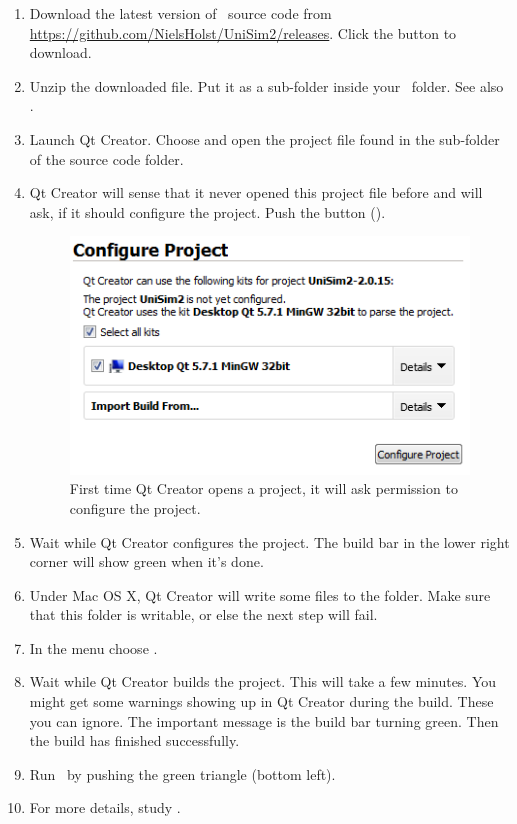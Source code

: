 \begin{enumerate}
\item Download the latest version of \US\ source code from \url{https://github.com/NielsHolst/UniSim2/releases}. Click the  button to download.
\item Unzip the downloaded file. Put it as a sub-folder inside your \devhomefolderexplained\ folder. See also .
\item Launch Qt Creator. Choose  and open the  project file found in the  sub-folder of the source code folder.
\item Qt Creator will sense that it never opened this project file before and will ask, if it should configure the project. Push the  button ().

\begin{figure} [h]
\centering
\includegraphics[width=\textwidth]{graphics/build-us-1}
\caption{First time Qt Creator opens a project, it will ask permission to configure the project.}
\label{fig:build-us-1}
\end{figure}

\item Wait while Qt Creator configures the project. The build bar in the lower right corner will show green when it's done.
\item Under Mac OS X, Qt Creator will write some files to the  folder. Make sure that this folder is writable, or else the next step will fail.
\item  In the  menu choose .
\item Wait while Qt Creator builds the project. This will take a few minutes. You might get some warnings showing up in Qt Creator during the build. These you can ignore. The important message is the build bar turning green. Then the build has finished successfully.
\item Run \US\ by pushing the green triangle (bottom left).
\item For more details, study .
\end{enumerate} 